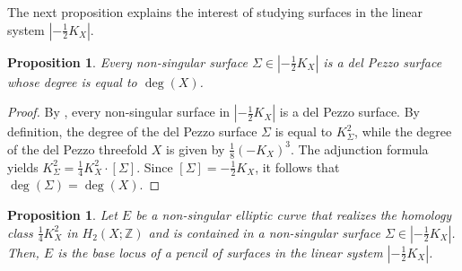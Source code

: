 \documentclass[10pt,a4paper]{article}
\numberwithin{equation}{section}
\theoremstyle{definition}
\theoremstyle{plain}
\newtheorem{proposition}[definition]{Proposition}
\theoremstyle{remark}
\begin{document}
 

The next proposition explains the interest of studying surfaces in the linear system $|-\frac{1}{2}K_X|$.

\begin{proposition}\label{Prop-delPezzo.surfaces}
Every non-singular surface $\Sigma\in |-\frac{1}{2}K_X|$ is a del Pezzo surface whose degree is equal to $\deg(X)$.
\end{proposition}

\begin{proof}
  By \cite[Corollary 1.11]{iskovskikh1977fano}, every non-singular surface in $ |-\frac{1}{2}K_X|$  is a del Pezzo surface. By definition, the degree of the del Pezzo surface $\Sigma$ is equal to $K_\Sigma^2$, while the degree of the del Pezzo threefold $X$ is given by $\frac{1}{8}(-K_X)^3$. The adjunction formula yields $K_{\Sigma}^2 = \frac{1}{4}K_X^2 \cdot [\Sigma]$. Since $[\Sigma] = -\frac{1}{2}K_X$, it follows that $\deg(\Sigma) = \deg(X)$.
\end{proof}

\begin{proposition} \label{prop-elliptic.implies.pencil}
Let $E$ be a non-singular elliptic curve that realizes the homology class $\frac{1}{4}K^2_X$ in $H_2(X;\mathbb{Z})$ and is contained in a non-singular surface $\Sigma\in |-\frac{1}{2}K_X|$. Then, $E$ is the base locus of a pencil of surfaces in the linear system $|-\frac{1}{2}K_X|$.
\end{proposition}
\end{document}
